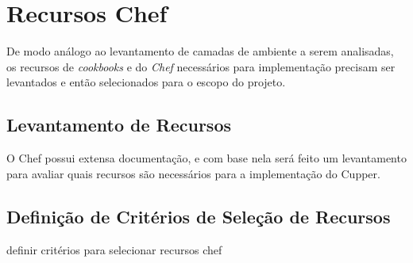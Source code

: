 \section{Recursos Chef}
De modo análogo ao levantamento de camadas de ambiente a serem analisadas,
os recursos de \textit{cookbooks} e do \textit{Chef} necessários para implementação precisam
ser levantados e então selecionados para o escopo do projeto.



\subsection{Levantamento de Recursos}
O Chef possui extensa documentação, e com base nela será feito
um levantamento para avaliar quais recursos são necessários para a implementação
do Cupper.

\subsection{Definição de Critérios de Seleção de Recursos}
\label{sec:defcritrecurso}
{\color{red} definir critérios para selecionar recursos chef}


